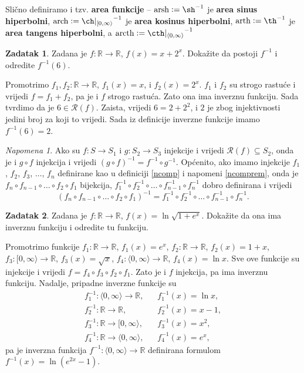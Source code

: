 \documentclass{book}
\renewenvironment{proof}{%
    \vspace{-\parskip}\begin{oldproof}%
    }{%
    \end{oldproof}%
}
\theoremstyle{definition}
\theoremstyle{definition}
\newtheorem{exercise}{Zadatak}
\theoremstyle{remark}
\newtheorem{remark}{Napomena}
\begin{document}
Slično definiramo i tzv. \textbf{area funkcije} -- $\mathrm{arsh}:=\sh^{-1}$ je \textbf{area sinus hiperbolni}, $\mathrm{arch}:={\ch|_{[0, \infty\rangle}}^{-1}$ je \textbf{area kosinus hiperbolni}, $\mathrm{arth}:=\th^{-1}$ je \textbf{area tangens hiperbolni}, a $\mathrm{arcth}:={\cth|_{\langle 0, \infty\rangle}}^{-1}$
\begin{exercise}
Zadana je $f : \mathbb{R}\to \mathbb{R}$, $f(x)=x+2^x$. Dokažite da postoji $f^{-1}$ i odredite $f^{-1}(6)$.
\end{exercise}
\begin{proof}[Rješenje]
Promotrimo $f_1, f_2 : \mathbb{R}\to \mathbb{R}$, $f_1(x)=x$, i $f_2(x)=2^x$. $f_1$ i $f_2$ su strogo rastuće i vrijedi $f=f_1+f_2$, pa je i $f$ strogo rastuća. Zato ona ima inverznu funkciju. Sada tvrdimo da je $6\in \mathcal{R}(f)$. Zaista, vrijedi $6=2+2^2$, i $2$ je zbog injektivnosti jedini broj za koji to vrijedi. Sada iz definicije inverzne funkcije imamo $f^{-1}(6)=2$.
\end{proof}
\begin{remark}
Ako su $f : S\to S_1$ i $g : S_2 \to S_3$ injekcije i vrijedi $\mathcal{R}(f)\subseteq S_2$, onda je i $g\circ f$ injekcija i vrijedi $(g\circ f)^{-1}=f^{-1}\circ g^{-1}$. Općenito, ako imamo injekcije $f_1$, $f_2$, $f_3$, $\dots$, $f_n$ definirane kao u definiciji \ref{ncomp} i napomeni \ref{ncomprem}, onda je $f_n\circ f_{n-1}\circ\dots\circ f_2\circ f_1$ bijekcija, $f_1^{-1}\circ f_2^{-1}\circ \dots \circ f_{n-1}^{-1}\circ f_n^{-1}$ dobro definirana i vrijedi
$$(f_n\circ f_{n-1}\circ\dots\circ f_2\circ f_1)^{-1}=f_1^{-1}\circ f_2^{-1}\circ \dots \circ f_{n-1}^{-1}\circ f_n^{-1}.$$
\end{remark}
\begin{exercise}
Zadana je $f : \mathbb{R}\to \mathbb{R}$, $f(x)=\ln{\sqrt{1+e^x}}$. Dokažite da ona ima inverznu funkciju i odredite tu funkciju.
\end{exercise}
\begin{proof}[Rješenje]
Promotrimo funkcije $f_1: \mathbb{R}\to \mathbb{R}$, $f_1(x)=e^x$, $f_2 : \mathbb{R}\to \mathbb{R}$, $f_2(x)=1+x$, $f_3 : [ 0,\infty\rangle\to \mathbb{R}$, $f_3(x)=\sqrt{x}$, $f_4 : \langle 0,\infty\rangle\to \mathbb{R}$, $f_4(x)=\ln{x}$. Sve ove funkcije su injekcije i vrijedi $f=f_4\circ f_3\circ f_2\circ f_1$. Zato je i $f$ injekcija, pa ima inverznu funkciju. Nadalje, pripadne inverzne funkcije su
\begin{align*}
f_1^{-1} : \langle 0, \infty\rangle\to \mathbb{R},&\;\;\; f_1^{-1}(x)=\ln{x},\\
f_2^{-1} : \mathbb{R}\to \mathbb{R},&\;\;\; f_2^{-1}(x)=x-1,\\
f_3^{-1} : \mathbb{R}\to [0, \infty\rangle,&\;\;\; f_3^{-1}(x)=x^2,\\
f_4^{-1} : \mathbb{R}\to \langle 0, \infty\rangle,&\;\;\; f_4^{-1}(x)=e^x,
\end{align*}
pa je inverzna funkcija $f^{-1} : \langle 0,\infty\rangle\to \mathbb{R}$ definirana formulom $f^{-1}(x)=\ln(e^{2x}-1)$.
\end{proof}
\end{document}
